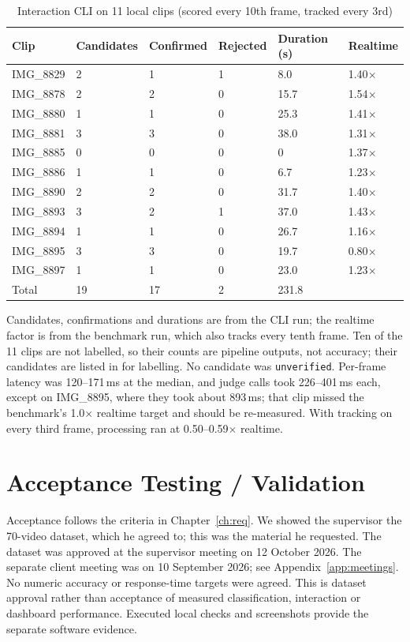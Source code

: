 \begin{table}[H]
\centering
\caption{Interaction CLI on 11 local clips (scored every 10th frame, tracked every 3rd)}
\label{tab:batch}
\begin{tabular}{P{0.14\textwidth}P{0.14\textwidth}P{0.12\textwidth}P{0.12\textwidth}P{0.14\textwidth}P{0.14\textwidth}}
\toprule
Clip & Candidates & Confirmed & Rejected & Duration (s) & Realtime\\
\midrule
IMG\_8829 & 2 & 1 & 1 & 8.0 & 1.40$\times$\\
IMG\_8878 & 2 & 2 & 0 & 15.7 & 1.54$\times$\\
IMG\_8880 & 1 & 1 & 0 & 25.3 & 1.41$\times$\\
IMG\_8881 & 3 & 3 & 0 & 38.0 & 1.31$\times$\\
IMG\_8885 & 0 & 0 & 0 & 0 & 1.37$\times$\\
IMG\_8886 & 1 & 1 & 0 & 6.7 & 1.23$\times$\\
IMG\_8890 & 2 & 2 & 0 & 31.7 & 1.40$\times$\\
IMG\_8893 & 3 & 2 & 1 & 37.0 & 1.43$\times$\\
IMG\_8894 & 1 & 1 & 0 & 26.7 & 1.16$\times$\\
IMG\_8895 & 3 & 3 & 0 & 19.7 & 0.80$\times$\\
IMG\_8897 & 1 & 1 & 0 & 23.0 & 1.23$\times$\\
\midrule
Total & 19 & 17 & 2 & 231.8 & \\
\bottomrule
\end{tabular}
\end{table}
Candidates, confirmations and durations are from the CLI run; the realtime factor is from the benchmark run, which also tracks every tenth frame. Ten of the 11 clips are not labelled, so their counts are pipeline outputs, not accuracy; their candidates are listed in  for labelling. No candidate was \texttt{unverified}. Per-frame latency was 120--171\,ms at the median, and judge calls took 226--401\,ms each, except on IMG\_8895, where they took about 893\,ms; that clip missed the benchmark's 1.0$\times$ realtime target and should be re-measured. With tracking on every third frame, processing ran at 0.50--0.59$\times$ realtime.

\section{Acceptance Testing / Validation}
Acceptance follows the criteria in Chapter~\ref{ch:req}. We showed the supervisor the 70-video dataset, which he agreed to; this was the material he requested. The dataset was approved at the supervisor meeting on 12 October 2026. The separate client meeting was on 10 September 2026; see Appendix~\ref{app:meetings}. No numeric accuracy or response-time targets were agreed. This is dataset approval rather than acceptance of measured classification, interaction or dashboard performance. Executed local checks and screenshots provide the separate software evidence.


